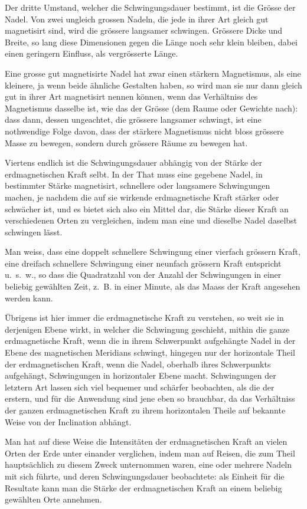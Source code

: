 \documentclass[12pt,a4paper]{article}
\begin{document}
Der dritte Umstand, welcher die Schwingungsdauer bestimmt, ist die Grösse der Nadel. Von zwei ungleich grossen Nadeln, die jede in ihrer Art gleich gut magnetisirt sind, wird die grössere langsamer schwingen. Grössere Dicke und Breite, so lang diese Dimensionen gegen die Länge noch sehr klein bleiben, dabei einen geringern Einfluss, als vergrösserte Länge.

Eine grosse gut magnetisirte Nadel hat zwar einen stärkern Magnetismus, als eine kleinere, ja wenn beide ähnliche Gestalten haben, so wird man sie nur dann gleich gut in ihrer Art magnetisirt nennen können, wenn das Verhältniss des Magnetismus dasselbe ist, wie das der Grösse (dem Raume oder Gewichte nach): dass dann, dessen ungeachtet, die grössere langsamer schwingt, ist eine nothwendige Folge davon, dass der stärkere Magnetismus nicht bloss grössere Masse zu bewegen, sondern durch grössere Räume zu bewegen hat.

Viertens endlich ist die Schwingungsdauer abhängig von der Stärke der erdmagnetischen Kraft selbt. In der That muss eine gegebene Nadel, in bestimmter Stärke magnetisirt, schnellere oder langsamere Schwingungen machen, je nachdem die auf sie wirkende erdmagnetische Kraft stärker oder schwächer ist, und es bietet sich also ein Mittel dar, die Stärke dieser Kraft an verschiedenen Orten zu vergleichen, indem man eine und dieselbe Nadel daselbst schwingen lässt.

Man weiss, dass eine doppelt schnellere Schwingung einer vierfach grössern Kraft, eine dreifach schnellere Schwingung einer neunfach grössern Kraft entspricht u.~s.~w., so dass die Quadratzahl von der Anzahl der Schwingungen in einer beliebig gewählten Zeit, z.~B. in einer Minute, als das Maass der Kraft angesehen werden kann.

Übrigens ist hier immer die erdmagnetische Kraft zu verstehen, so weit sie in derjenigen Ebene wirkt, in welcher die Schwingung geschieht, mithin die ganze erdmagnetische Kraft, wenn die in ihrem Schwerpunkt aufgehängte Nadel in der Ebene des magnetischen Meridians schwingt, hingegen nur der horizontale Theil der erdmagnetischen Kraft, wenn die Nadel, oberhalb ihres Schwerpunkts aufgehängt, Schwingungen in horizontaler Ebene macht. Schwingungen der letztern Art lassen sich viel bequemer und schärfer beobachten, als die der erstern, und für die Anwendung sind jene eben so brauchbar, da das Verhältniss der ganzen erdmagnetischen Kraft zu ihrem horizontalen Theile auf bekannte Weise von der Inclination abhängt.

Man hat auf diese Weise die Intensitäten der erdmagnetischen Kraft an vielen Orten der Erde unter einander verglichen, indem man auf Reisen, die zum Theil hauptsächlich zu diesem Zweck unternommen waren, eine oder mehrere Nadeln mit sich führte, und deren Schwingungsdauer beobachtete: als Einheit für die Resultate kann man die Stärke der erdmagnetischen Kraft an einem beliebig gewählten Orte annehmen.
\end{document}
